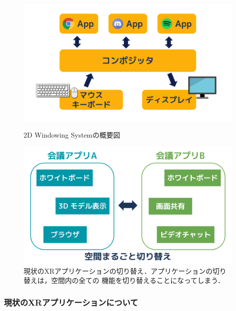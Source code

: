 \begin{figure}[htbp]
  \begin{minipage}[t]{0.50\linewidth}
    \centering
    \includegraphics[keepaspectratio, width=\linewidth]{fig/2d-windowing-system.png}
    \caption{2D Windowing Systemの概要図}
    \label{fig:2d-windowing-system}
  \end{minipage}
  \begin{minipage}[t]{0.50\linewidth}
    \centering
    \includegraphics[keepaspectratio, width=0.9\linewidth]{fig/xr-app-switch.png}
    \caption{
      現状のXRアプリケーションの切り替え．アプリケーションの切り替えは，空間内の全ての
      機能を切り替えることになってしまう．
    }
    \label{fig:xr-app-switch}
  \end{minipage}
\end{figure}

\subsubsection{現状のXRアプリケーションについて}

